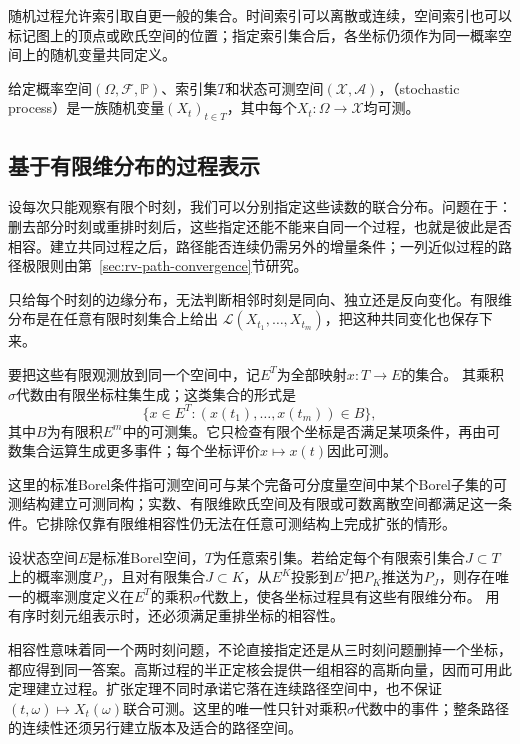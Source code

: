 \label{sec:rv-paths}
随机过程允许索引取自更一般的集合。时间索引可以离散或连续，空间索引也可以标记图上的顶点或欧氏空间的位置；指定索引集合后，各坐标仍须作为同一概率空间上的随机变量共同定义。
\begin{definition}[随机过程]
  \label{def:stoch-process}
  给定概率空间\((\Omega,\mathcal F,\mathbb P)\)、索引集\(T\)和状态可测空间\((\mathcal X,\mathcal A)\)，（stochastic process）是一族随机变量\((X_t)_{t\in T}\)，其中每个\(X_t:\Omega\to\mathcal X\)均可测。
\end{definition}

\subsection{基于有限维分布的过程表示}
\label{sec:rv-finite-dimensional-laws}
设每次只能观察有限个时刻，我们可以分别指定这些读数的联合分布。问题在于：删去部分时刻或重排时刻后，这些指定还能不能来自同一个过程，也就是彼此是否相容。建立共同过程之后，路径能否连续仍需另外的增量条件；一列近似过程的路径极限则由第~\ref{sec:rv-path-convergence}节研究。

只给每个时刻的边缘分布，无法判断相邻时刻是同向、独立还是反向变化。有限维分布是在任意有限时刻集合上给出
\(\mathcal L(X_{t_1},\ldots,X_{t_m})\)，把这种共同变化也保存下来。

要把这些有限观测放到同一个空间中，记\(E^T\)为全部映射\(x:T\to E\)的集合。
其乘积\(\sigma\)代数由有限坐标柱集生成；这类集合的形式是
\[
 \{x\in E^T:(x(t_1),\ldots,x(t_m))\in B\},
\]
其中\(B\)为有限积\(E^m\)中的可测集。它只检查有限个坐标是否满足某项条件，再由可数集合运算生成更多事件；每个坐标评价\(x\mapsto x(t)\)因此可测。

这里的标准Borel条件指可测空间可与某个完备可分度量空间中某个Borel子集的可测结构建立可测同构；实数、有限维欧氏空间及有限或可数离散空间都满足这一条件。它排除仅靠有限维相容性仍无法在任意可测结构上完成扩张的情形。

\begin{theorem}[Kolmogorov扩张的标准Borel版本]
\label{thm:rv-kolmogorov-extension}

设状态空间\(E\)是标准Borel空间，\(T\)为任意索引集。若给定每个有限索引集合\(J\subset T\)上的概率测度\(P_J\)，且对有限集合\(J\subset K\)，从\(E^K\)投影到\(E^J\)把\(P_K\)推送为\(P_J\)，则存在唯一的概率测度定义在\(E^T\)的乘积\(\sigma\)代数上，使各坐标过程具有这些有限维分布。
用有序时刻元组表示时，还必须满足重排坐标的相容性。
\end{theorem}
相容性意味着同一个两时刻问题，不论直接指定还是从三时刻问题删掉一个坐标，都应得到同一答案。高斯过程的半正定核会提供一组相容的高斯向量，因而可用此定理建立过程。扩张定理不同时承诺它落在连续路径空间中，也不保证
\((t,\omega)\mapsto X_t(\omega)\)联合可测。这里的唯一性只针对乘积\(\sigma\)代数中的事件；整条路径的连续性还须另行建立版本及适合的路径空间。

